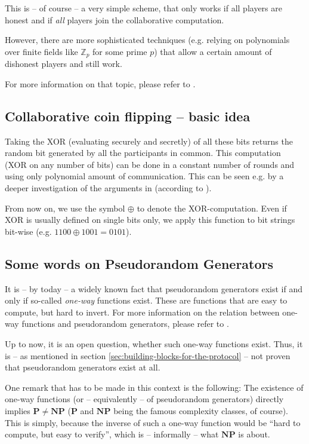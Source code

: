 This is -- of course -- a very simple scheme, that only works if all players are honest and if \emph{all} players join the collaborative computation.

However, there are more sophisticated techniques (e.g. relying on polynomials over finite fields like $\mathbb Z_p$ for some prime $p$) that allow a certain amount of dishonest players and still work. 

For more information on that topic, please refer to \cite{shamir_secret_sharing}.

\subsection{Collaborative coin flipping -- basic idea}
\label{sec:appendix-coin-flipping}

Taking the XOR (evaluating securely and secretly) of all these bits returns the random bit generated by all the participants in common. This computation (XOR on any number of bits) can be done in a constant number of rounds and using only polynomial amount of communication. This can be seen e.g. by a deeper investigation of the arguments in \cite{beaver-verifiable-secret-sharing} (according to \cite{Beaver1990}).

From now on, we use the symbol $\oplus$ to denote the XOR-computation. Even if XOR is usually defined on single bits only, we apply this function to bit strings bit-wise (e.g. $1100\oplus1001=0101$).

\subsection{Some words on Pseudorandom Generators}
\label{sec:appendix-pseudorandom-generators}

It is -- by today -- a widely known fact that pseudorandom generators exist if and only if so-called \emph{one-way} functions exist. These are functions that are easy to compute, but hard to invert. For more information on the relation between one-way functions and pseudorandom generators, please refer to \cite{lecture-notes-goldwasser-bellare,yao-theory-application-trapdoor-functions,pseudorandom-generators-blum}.

Up to now, it is an open question, whether such one-way functions exist. Thus, it is -- as mentioned in section \ref{sec:building-blocks-for-the-protocol} -- not proven that pseudorandom generators exist at all.

One remark that has to be made in this context is the following: The existence of one-way functions (or -- equivalently -- of pseudorandom generators) directly implies $\mathbf{P}\neq\mathbf{NP}$ ($\mathbf{P}$ and $\mathbf{NP}$ being the famous complexity classes, of course). This is simply, because the inverse of such a one-way function would be ``hard to compute, but easy to verify'', which is -- informally -- what $\mathbf{NP}$ is about.

